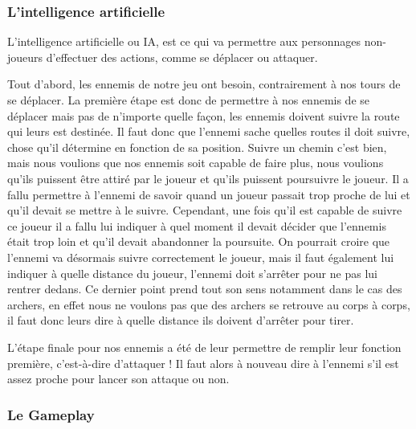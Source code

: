 \documentclass[a4paper, 12pt]{article}
\begin{document}
		\subsubsection{L'intelligence artificielle}
		L’intelligence artificielle ou IA, est ce qui va permettre aux personnages non-joueurs d’effectuer des actions, comme se déplacer ou attaquer. 
\par Tout d’abord, les ennemis de notre jeu ont besoin, contrairement à nos tours de se déplacer. La première étape est donc de permettre à nos ennemis de se déplacer mais pas de n’importe quelle façon, les ennemis doivent suivre la route qui leurs est destinée. Il faut donc que l’ennemi sache quelles routes il doit suivre, chose qu’il détermine en fonction de sa position. Suivre un chemin c’est bien, mais nous voulions que nos ennemis soit capable de faire plus, nous voulions qu’ils puissent être attiré par le joueur et qu’ils puissent poursuivre le joueur. Il a fallu permettre à l’ennemi de savoir quand un joueur passait trop proche de lui et qu’il devait se mettre à le suivre. Cependant, une fois qu’il est capable de suivre ce joueur il a fallu lui indiquer à quel moment il devait décider que l’ennemis était trop loin et qu’il devait abandonner la poursuite. On pourrait croire que l’ennemi va désormais suivre correctement le joueur, mais il faut également lui indiquer à quelle distance du joueur, l’ennemi doit s’arrêter pour ne pas lui rentrer dedans. Ce dernier point prend tout son sens notamment dans le cas des archers, en effet nous ne voulons pas que des archers se retrouve au corps à corps, il faut donc leurs dire à quelle distance ils doivent d’arrêter pour tirer.
\par L’étape finale pour nos ennemis a été de leur permettre de remplir leur fonction première, c’est-à-dire d’attaquer ! Il faut alors à nouveau dire à l’ennemi s’il est assez proche pour lancer son attaque ou non.

		\subsubsection{Le Gameplay}
\end{document}
